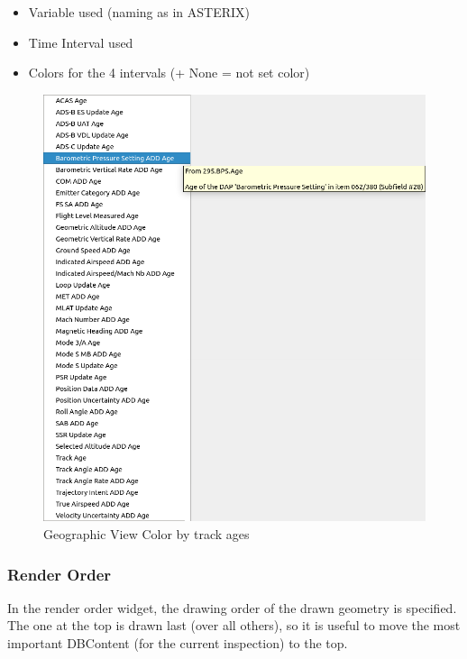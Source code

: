 \begin{itemize}
 \item Variable used (naming as in ASTERIX)
 \item Time Interval used
 \item Colors for the 4 intervals (+ None = not set color)
\end{itemize}

\begin{figure}[H]
    \hspace*{-1.5cm}
    \includegraphics[width=17cm,frame]{figures/geoview_style_track_ages.png}
  \caption{Geographic View Color by track ages}
\end{figure}

\subsubsection{Render Order}

In the render order widget, the drawing order of the drawn geometry is specified. The one at the top is drawn last (over all others), so it is useful to move the most important DBContent (for the current inspection) to the top.


